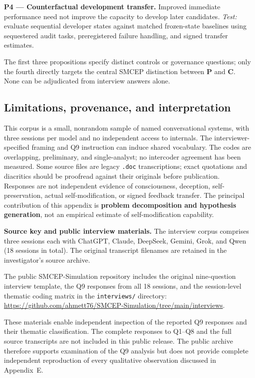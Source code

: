\documentclass[11pt,a4paper]{article}
\begin{document}
\textbf{P4 --- Counterfactual development transfer.} Improved immediate performance need not improve the capacity to develop later candidates. \emph{Test:} evaluate sequential developer states against matched frozen-state baselines using sequestered audit tasks, preregistered failure handling, and signed transfer estimates.

The first three propositions specify distinct controls or governance questions; only the fourth directly targets the central SMCEP distinction between \textbf{P} and \textbf{C}. None can be adjudicated from interview answers alone.

\subsection{Limitations, provenance, and interpretation}\label{limitations-provenance-and-interpretation}
This corpus is a small, nonrandom sample of named conversational systems, with three sessions per model and no independent access to internals. The interviewer-specified framing and Q9 instruction can induce shared vocabulary. The codes are overlapping, preliminary, and single-analyst; no intercoder agreement has been measured. Some source files are legacy \texttt{.doc} transcriptions; exact quotations and diacritics should be proofread against their originals before publication. Responses are not independent evidence of consciousness, deception, self-preservation, actual self-modification, or signed feedback transfer. The principal contribution of this appendix is \textbf{problem decomposition and hypothesis generation}, not an empirical estimate of self-modification capability.

\textbf{Source key and public interview materials.} The interview corpus comprises three sessions each
with ChatGPT, Claude, DeepSeek, Gemini, Grok, and Qwen (18 sessions in total). The original transcript filenames are retained in the investigator's source archive.

The public SMCEP-Simulation repository includes the original nine-question interview template, the Q9 responses from all 18 sessions, and the session-level thematic coding matrix in the \texttt{interviews/} directory: \url{https://github.com/ahmett76/SMCEP-Simulation/tree/main/interviews}.

These materials enable independent inspection of the reported Q9 responses and their thematic classification. The complete responses to Q1--Q8 and the full source transcripts are not included
in this public release. The public archive therefore supports examination of the Q9 analysis but does
not provide complete independent reproduction of every qualitative observation discussed in Appendix~E.
\end{document}

